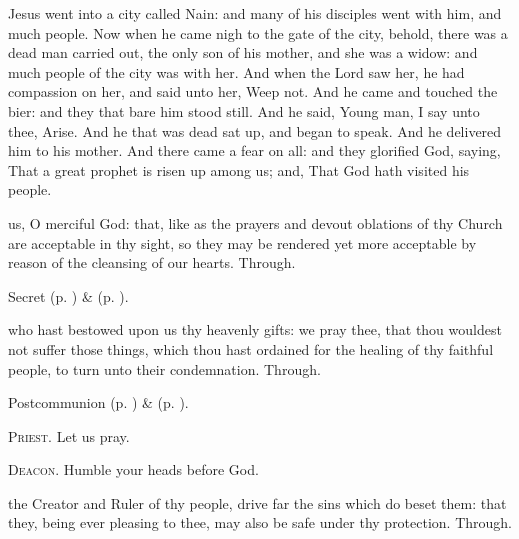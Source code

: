 
 Jesus went into a city called Nain: and many of his disciples went with him, and much people. Now when he came nigh to the gate of the city, behold, there was a dead man carried out, the only son of his mother, and she was a widow: and much people of the city was with her. And when the Lord saw her, he had compassion on her, and said unto her, Weep not. And he came and touched the bier: and they that bare him stood still. And he said, Young man, I say unto thee, Arise. And he that was dead sat up, and began to speak. And he delivered him to his mother. And there came a fear on all: and they glorified God, saying, That a great prophet is risen up among us; and, That God hath visited his people.


\secret
{} us, O merciful God: that, like as the prayers and devout oblations of thy Church are acceptable in thy sight, so they may be rendered yet more acceptable by reason of the cleansing of our hearts. Through.
\begin{rubric}
     Secret  (p. \pageref{AshWednesdayMassSecret}) \&   (p. \pageref{SPLivingDeparted}).
\end{rubric}


\postcommunion
{} who hast bestowed upon us thy heavenly gifts: we pray thee, that thou wouldest not suffer those things, which thou hast ordained for the healing of thy faithful people, to turn unto their condemnation. Through.
\begin{rubric}
     Postcommunion  (p. \pageref{AshWednesdayMassPostcommunion}) \&   (p. \pageref{SPLivingDeparted}).
\end{rubric}

\textsc{Priest.} Let us pray.\par
\textsc{Deacon.} Humble your heads before God.\par
{} the Creator and Ruler of thy people, drive far the sins which do beset them: that they, being ever pleasing to thee, may also be safe under thy protection. Through.


